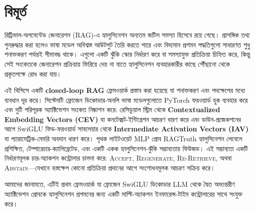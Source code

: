 \clearpage
\setcounter{secnumdepth}{-1}
\section{\hfil \bengalifont বিমূর্ত \hfil}
\vspace{0.05cm}
\thispagestyle{front}

{\bengalifont

রিট্রিভাল-অগমেন্টেড জেনারেশন (\textenglish{RAG})-এ হ্যালুসিনেশন অন্যতম জটিল সমস্যা হিসেবে রয়ে গেছে। প্রাসঙ্গিক তথ্য পুনরুদ্ধার করা হলেও ভাষা মডেল অবিশ্বস্ত আউটপুট তৈরি করতে পারে এবং বিদ্যমান প্রশমন পদ্ধতিগুলো সাধারণত শুধু শনাক্তকরণ পর্যন্তই সীমাবদ্ধ থাকে। এগুলো একটি ঝুঁকি স্কোর নির্ধারণ করে বা সমস্যাযুক্ত প্রতিক্রিয়া চিহ্নিত করে, কিন্তু সেই সংকেতকে জেনারেশন প্রক্রিয়ায় ফিরিয়ে দেয় না যাতে হ্যালুসিনেশন ব্যবহারকারীর কাছে পৌঁছানো থেকে প্রকৃতপক্ষে রোধ করা যায়।

এই থিসিসে একটি \textenglish{\textbf{closed-loop RAG}} ফ্রেমওয়ার্ক প্রস্তাব করা হয়েছে যা শনাক্তকরণ এবং পদক্ষেপের মধ্যে ব্যবধান দূর করে। সিস্টেমটি ফ্রোজেন ডিকোডার-অনলি ভাষা মডেলগুলোতে \textenglish{PyTorch} ফরওয়ার্ড হুক ব্যবহার করে এবং দুটি পরিপূরক অ্যাক্টিভেশন সংকেত নিষ্কাশন করে: রেসিডুয়াল স্ট্রিম থেকে \textenglish{\textbf{Contextualized Embedding Vectors (CEV)}} যা কনটেক্সট-ইন্টিগ্রেশন আচরণ ধারণ করে এবং ডাউন-প্রজেকশনের আগে \textenglish{SwiGLU} ফিড-ফরওয়ার্ড সাবলেয়ার থেকে \textenglish{\textbf{Intermediate Activation Vectors (IAV)}} যা প্যারামেট্রিক-মেমরি অবদান ধারণ করে। পৃথক লাইটওয়েট \textenglish{MLP} প্রোব \textenglish{RAGTruth} হ্যালুসিনেশন লেবেলে প্রশিক্ষিত, টেম্পারেচার-ক্যালিব্রেটেড, এবং একটি একক হ্যালুসিনেশন-ঝুঁকি সম্ভাব্যতায় ফিউজড। এই সম্ভাব্যতা একটি নির্ধারণমূলক চার-অ্যাকশন কন্ট্রোলার চালনা করে: \textenglish{\textsc{Accept}}, \textenglish{\textsc{Regenerate}}, \textenglish{\textsc{Re-Retrieve}}, অথবা \textenglish{\textsc{Abstain}}---যেখানে হস্তক্ষেপ কোনো প্রতিক্রিয়া প্রদানের আগে সংশোধনমূলক আচরণ সক্রিয় করে।

আমাদের জানামতে, এটিই প্রথম ফ্রেমওয়ার্ক যা ফ্রোজেন \textenglish{SwiGLU} ডিকোডার \textenglish{LLM} থেকে দ্বৈত অভ্যন্তরীণ অ্যাক্টিভেশন প্রোবকে হ্যালুসিনেশন প্রশমনের জন্য একটি মাল্টি-অ্যাকশন ইনফারেন্স-টাইম কন্ট্রোলারের সাথে সংযুক্ত করে।

}
